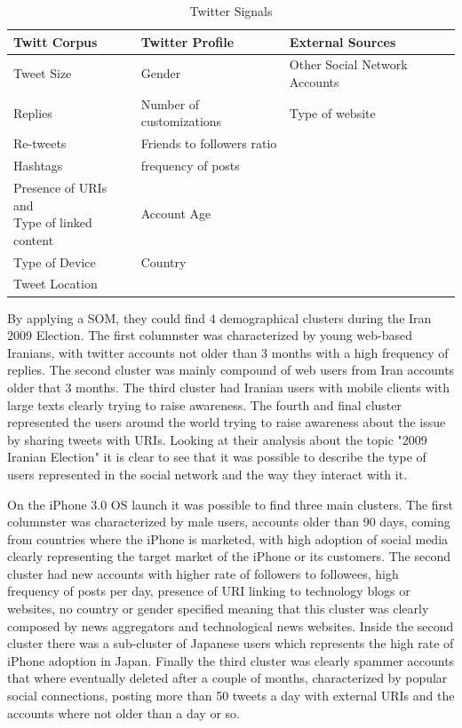 \begin{table}[H]
  \caption{Twitter Signals}
  \label{tab:twitter_signals}
  \begin{center}
    \begin{tabular}{|l|l|l|}
    \hline

    \hline
    \textbf{Twitt Corpus} & \textbf{Twitter Profile} & \textbf{External Sources} \\
    \hline
       Tweet Size & Gender & Other Social Network Accounts\\
    \hline
       Replies & Number of customizations & Type of website\\
    \hline
       Re-tweets & Friends to followers ratio & \\
    \hline
       Hashtags & frequency of posts & \\
    \hline
      \specialcell{Presence of URIs and \\ Type of linked content}
        & Account Age
        & \\
    \hline
       Type of Device & Country & \\
    \hline
       Tweet Location &  & \\
    \hline
    \end{tabular}
  \end{center}
\end{table}

By applying a SOM, they could find 4 demographical clusters during the Iran 2009 Election. The first columnster was characterized by young web-based Iranians, with twitter accounts not older than 3 months with a high frequency of replies. The second cluster was mainly compound of web users from Iran accounts older that 3 months. The third cluster had Iranian users with mobile clients with large texts clearly trying to raise awareness. The fourth and final cluster represented the users around the world trying to raise awareness about the issue by sharing tweets with URIs.
Looking at their analysis about the topic "2009 Iranian Election" it is clear to see that it was possible to describe the type of users represented in the social network and the way they interact with it.

On the iPhone 3.0 OS launch it was possible to find three main clusters. The first columnster was characterized by male users, accounts older than 90 days, coming from countries where the iPhone is marketed, with high adoption of social media clearly representing the target market of the iPhone or its customers. The second cluster had new accounts with higher rate of followers to followees, high frequency of posts per day, presence of URI linking to technology blogs or websites, no country or gender specified meaning that this cluster was clearly composed by news aggregators and technological news websites. Inside the second cluster there was a sub-cluster of Japanese users which represents the high rate of iPhone adoption in Japan. Finally the third cluster was clearly spammer accounts that where eventually deleted after a couple of months, characterized by popular social connections, posting more than 50 tweets a day with external URIs and the accounts where not older than a day or so.

